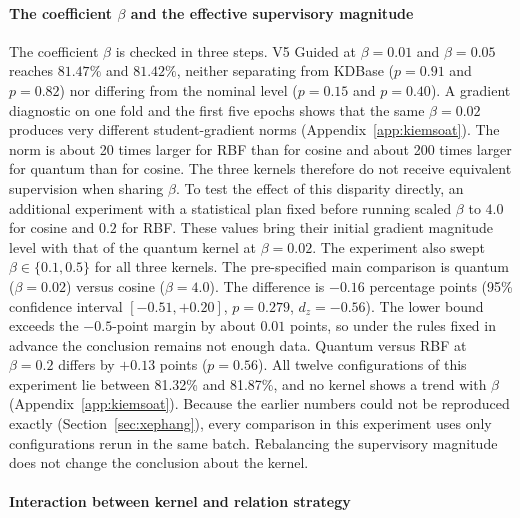 \paragraph{The coefficient $\beta$ and the effective supervisory magnitude}

The coefficient $\beta$ is checked in three steps. V5 Guided at
$\beta = 0.01$ and $\beta = 0.05$ reaches $81.47\%$ and $81.42\%$,
neither separating from KDBase ($p = 0.91$ and $p = 0.82$) nor differing
from the nominal level ($p = 0.15$ and $p = 0.40$). A gradient diagnostic on one fold and the first five epochs shows that
the same $\beta = 0.02$ produces very different student-gradient norms
(Appendix~\ref{app:kiemsoat}). The norm is about 20 times larger for RBF
than for cosine and about 200 times larger for quantum than for cosine. The three kernels therefore
do not receive equivalent supervision when sharing $\beta$. To test the effect of this disparity directly, an additional experiment
with a statistical plan fixed before running scaled $\beta$ to $4.0$ for
cosine and $0.2$ for RBF. These values bring their initial gradient
magnitude level with that of the quantum kernel at $\beta = 0.02$. The experiment also
swept $\beta \in \{0.1, 0.5\}$ for all three kernels. The pre-specified
main comparison is quantum ($\beta = 0.02$) versus cosine
($\beta = 4.0$). The difference is $-0.16$ percentage points (95\%
confidence interval $[-0.51, +0.20]$, $p = 0.279$, $d_z = -0.56$). The
lower bound exceeds the $-0.5$-point margin by about $0.01$ points, so
under the rules fixed in advance the conclusion remains not enough
data. Quantum versus RBF at $\beta = 0.2$ differs by $+0.13$ points
($p = 0.56$). All twelve configurations of this experiment lie between
81.32\% and 81.87\%, and no kernel shows a trend with $\beta$
(Appendix~\ref{app:kiemsoat}). Because the earlier numbers could not be
reproduced exactly (Section~\ref{sec:xephang}), every comparison in this
experiment uses only configurations rerun in the same batch.
Rebalancing the supervisory magnitude does not change the conclusion
about the kernel.

\paragraph{Interaction between kernel and relation strategy}


